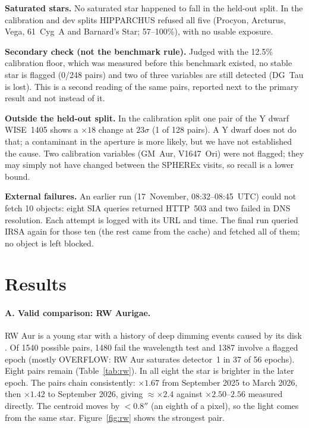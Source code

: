 \documentclass[11pt,a4paper]{article}
\begin{document}
\textbf{Saturated stars.} No saturated star happened to fall in the held-out split. In the calibration and dev
splits HIPPARCHUS refused all five (Procyon, Arcturus, Vega, 61~Cyg~A and Barnard's Star; 57--100\%), with no
usable exposure.

\textbf{Secondary check (not the benchmark rule).} Judged with the 12.5\% calibration floor, which was measured before
this benchmark existed, no stable star is flagged (0/248 pairs) and two of three variables are still detected
(DG~Tau is lost). This is a second reading of the same pairs, reported next to the primary result and not instead of it.

\textbf{Outside the held-out split.} In the calibration split one pair of the Y dwarf WISE~1405 shows a $\times18$
change at $23\sigma$ (1 of 128 pairs). A Y dwarf does not do that; a contaminant in the aperture is more likely, but
we have not established the cause. Two calibration variables (GM~Aur, V1647~Ori) were not flagged; they may simply
not have changed between the SPHEREx visits, so recall is a lower bound.

\textbf{External failures.} An earlier run (17~November, 08:32--08:45~UTC) could not fetch 10 objects: eight SIA
queries returned HTTP~503 and two failed in DNS resolution. Each attempt is logged with its URL and time. The final
run queried IRSA again for those ten (the rest came from the cache) and fetched all of them; no object is left blocked.

\section{Results}
\paragraph{A. Valid comparison: RW Aurigae.} RW Aur is a young star with a history of deep dimming events caused by
its disk \parencite{rodriguez2013}. Of 1540 possible pairs, 1480 fail the wavelength test and 1387 involve a flagged
epoch (mostly OVERFLOW: RW Aur saturates detector~1 in 37 of 56 epochs). Eight pairs remain (Table~\ref{tab:rw}). In
all eight the star is brighter in the later epoch. The pairs chain consistently: $\times1.67$ from September 2025 to
March 2026, then $\times1.42$ to September 2026, giving $\approx\times2.4$ against $\times2.50$--$2.56$ measured directly. The
centroid moves by $<0.8''$ (an eighth of a pixel), so the light comes from the same star. Figure~\ref{fig:rw} shows the
strongest pair.
\end{document}
